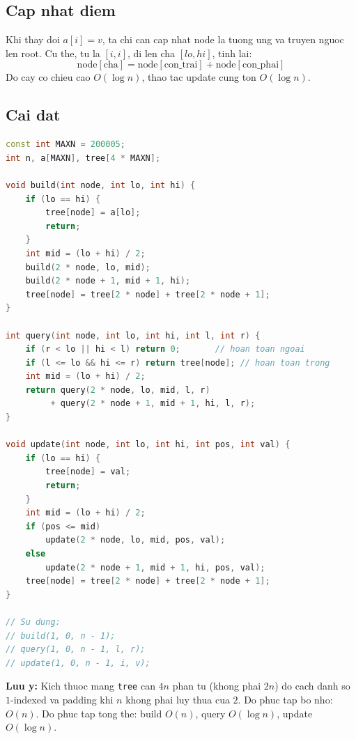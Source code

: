 \subsection{Cap nhat diem}

Khi thay doi $a[i] = v$, ta chi can cap nhat node la tuong ung va truyen nguoc len root.
Cu the, tu la $[i, i]$, di len cha $[lo, hi]$, tinh lai:
\[
  \text{node}[\text{cha}] = \text{node}[\text{con\_trai}] + \text{node}[\text{con\_phai}]
\]
Do cay co chieu cao $O(\log n)$, thao tac update cung ton $O(\log n)$.

\subsection{Cai dat}

\begin{lstlisting}[language=C++]
const int MAXN = 200005;
int n, a[MAXN], tree[4 * MAXN];

void build(int node, int lo, int hi) {
    if (lo == hi) {
        tree[node] = a[lo];
        return;
    }
    int mid = (lo + hi) / 2;
    build(2 * node, lo, mid);
    build(2 * node + 1, mid + 1, hi);
    tree[node] = tree[2 * node] + tree[2 * node + 1];
}

int query(int node, int lo, int hi, int l, int r) {
    if (r < lo || hi < l) return 0;       // hoan toan ngoai
    if (l <= lo && hi <= r) return tree[node]; // hoan toan trong
    int mid = (lo + hi) / 2;
    return query(2 * node, lo, mid, l, r)
         + query(2 * node + 1, mid + 1, hi, l, r);
}

void update(int node, int lo, int hi, int pos, int val) {
    if (lo == hi) {
        tree[node] = val;
        return;
    }
    int mid = (lo + hi) / 2;
    if (pos <= mid)
        update(2 * node, lo, mid, pos, val);
    else
        update(2 * node + 1, mid + 1, hi, pos, val);
    tree[node] = tree[2 * node] + tree[2 * node + 1];
}

// Su dung:
// build(1, 0, n - 1);
// query(1, 0, n - 1, l, r);
// update(1, 0, n - 1, i, v);
\end{lstlisting}

\textbf{Luu y:}
Kich thuoc mang \texttt{tree} can $4n$ phan tu (khong phai $2n$) do cach danh so $1$-indexed
va padding khi $n$ khong phai luy thua cua $2$.
Do phuc tap bo nho: $O(n)$.
Do phuc tap tong the: build $O(n)$, query $O(\log n)$, update $O(\log n)$.
